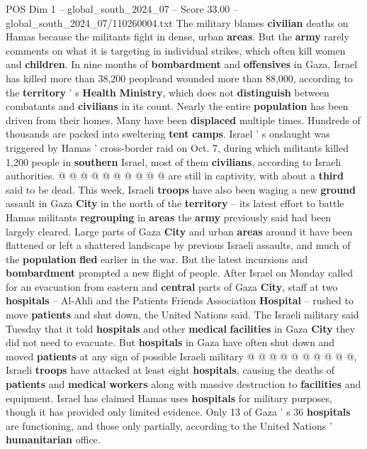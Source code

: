 \begin{textsample}{POS Dim 1 – global\_south\_2024\_07 – Score 33.00 – global\_south\_2024\_07/110260004.txt}
The military blames \textbf{civilian} deaths on Hamas because the militants fight in dense, urban \textbf{areas}.
But the \textbf{army} rarely comments on what it is targeting in individual strikes, which often kill women and \textbf{children}.
In nine months of \textbf{bombardment} and \textbf{offensives} in Gaza, Israel has killed more than 38,200 peopleand wounded more than 88,000, according to the \textbf{territory} ' s \textbf{Health} \textbf{Ministry}, which does not \textbf{distinguish} between combatants and \textbf{civilians} in its count.
Nearly the entire \textbf{population} has been driven from their homes.
Many have been \textbf{displaced} multiple times.
Hundreds of thousands are packed into sweltering \textbf{tent} \textbf{camps}.
Israel ' s onslaught was triggered by Hamas ' cross-border raid on Oct. 7, during which militants killed 1,200 people in \textbf{southern} Israel, most of them \textbf{civilians}, according to Israeli authorities. @ @ @ @ @ @ @ @ @ @ are still in captivity, with about a \textbf{third} said to be dead.
This week, Israeli \textbf{troops} have also been waging a new \textbf{ground} assault in Gaza \textbf{City} in the north of the \textbf{territory} -- its latest effort to battle Hamas militants \textbf{regrouping} in \textbf{areas} the \textbf{army} previously said had been largely cleared.
Large parts of Gaza \textbf{City} and urban \textbf{areas} around it have been flattened or left a shattered landscape by previous Israeli assaults, and much of the \textbf{population} \textbf{fled} earlier in the war.
But the latest incursions and \textbf{bombardment} prompted a new flight of people.
After Israel on Monday called for an evacuation from eastern and \textbf{central} parts of Gaza \textbf{City}, staff at two \textbf{hospitals} -- Al-Ahli and the Patients Friends Association \textbf{Hospital} -- rushed to move \textbf{patients} and shut down, the United Nations said.
The Israeli military said Tuesday that it told \textbf{hospitals} and other \textbf{medical} \textbf{facilities} in Gaza \textbf{City} they did not need to evacuate.
But \textbf{hospitals} in Gaza have often shut down and moved \textbf{patients} at any sign of possible Israeli military @ @ @ @ @ @ @ @ @ @, Israeli \textbf{troops} have attacked at least eight \textbf{hospitals}, causing the deaths of \textbf{patients} and \textbf{medical} \textbf{workers} along with massive destruction to \textbf{facilities} and equipment.
Israel has claimed Hamas uses \textbf{hospitals} for military purposes, though it has provided only limited evidence.
Only 13 of Gaza ' s 36 \textbf{hospitals} are functioning, and those only partially, according to the United Nations ' \textbf{humanitarian} office.

\end{textsample}
